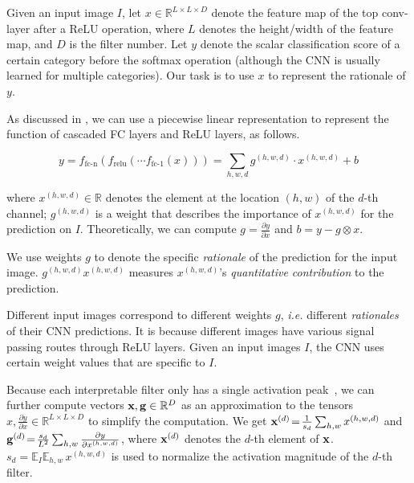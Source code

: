 \documentclass[10pt,twocolumn,letterpaper]{article}
\begin{document}
Given an input image $I$, let {\small$x\in\mathbb{R}^{L\times L\times D}$} denote the feature map of the top conv-layer after a ReLU operation, where $L$ denotes the height/width of the feature map, and $D$ is the filter number. Let $y$ denote the scalar classification score of a certain category before the softmax operation (although the CNN is usually learned for multiple categories). Our task is to use $x$ to represent the rationale of $y$.

As discussed in \cite{shap,trust}, we can use a piecewise linear representation to represent the function of cascaded FC layers and ReLU layers, as follows.
\begin{small}
\begin{equation}
y=f_{\textrm{fc-n}}(f_{\textrm{relu}}(\cdots f_{\textrm{fc-1}}(x)))=\sum_{h,w,d}g^{(h,w,d)}\cdot x^{(h,w,d)}+b
\end{equation}
\end{small}
where {\small$x^{(h,w,d)}\in\mathbb{R}$} denotes the element at the location $(h,w)$ of the $d$-th channel; {\small$g^{(h,w,d)}$} is a weight that describes the importance of {\small$x^{(h,w,d)}$} for the prediction on $I$. Theoretically, we can compute {\small$g\!=\!\frac{\partial y}{\partial x}$} and {\small$b\!=\!y-g\otimes x$}.

We use weights $g$ to denote the specific \textit{rationale} of the prediction for the input image. {\small$g^{(h,w,d)}x^{(h,w,d)}$} measures {\small$x^{(h,w,d)}$}'s \textit{quantitative contribution} to the prediction.

Different input images correspond to different weights $g$, \emph{i.e.} different \textit{rationales} of their CNN predictions. It is because different images have various signal passing routes through ReLU layers. Given an input images $I$, the CNN uses certain weight values that are specific to $I$.

Because each interpretable filter only has a single activation peak~\cite{interpretableCNN}, we can further compute vectors {\small${\bf x},{\bf g}\in\mathbb{R}^{D}$} as an approximation to the tensors {\small$x,\frac{\partial y}{\partial x}\in\mathbb{R}^{L\times L\times D}$} to simplify the computation. We get {\small${\bf x}^{(d)}\!=\!\frac{1}{s_{d}}\sum_{h,w}x^{(h,w,d)}$} and {\small${\bf g}^{(d)}\!=\!\frac{s_{d}}{L^2}\sum_{h,w}\frac{\partial y}{\partial x^{(h,w,d)}}$}, where {\small${\bf x}^{(d)}$} denotes the $d$-th element of {\small${\bf x}$}. {\small$s_{d}\!=\!{\mathbb{E}}_{I}{\mathbb{E}}_{h,w}\,x^{(h,w,d)}$} is used to normalize the activation magnitude of the $d$-th filter.
\end{document}
